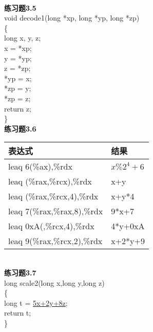 \documentclass{article}
\begin{document}
\begin{CJK}{UTF8}{uyhei}
\begin{table}[htbp]
\begin{tabular}{|m{8em}<{\centering}|m{8em}<{\centering}|m{12em}<{\centering}|}
	\hline
\end{tabular}
\end{table}	\\[2ex]
\newpage
\noindent\textbf{练习题3.5}	\\[2ex]
void decode1(long *xp, long *yp, long *zp)	\\
\{	\\
	\hspace*{4em}	long x, y, z;	\\
	\hspace*{4em}	x = *xp;	\\
	\hspace*{4em}	y = *yp;	\\
	\hspace*{4em}	z = *zp;	\\
	\hspace*{4em}	*yp = x;	\\
	\hspace*{4em}	*zp = y;	\\
	\hspace*{4em}	*zp = z;	\\
	\hspace*{4em}	return z;	\\
\}	\\[3ex]
\textbf{练习题3.6}	\\
\begin{table}[htbp]
\centering
\begin{tabular}{|m{18em}<{\centering}|m{10em}<{\centering}|}
	\hline
	表达式	&	结果	\\
	\hline
	leaq 6(\%ax),\%rdx	&	$x\%2^4+6$	\\
	\hline
	leaq (\%rax,\%rcx),\%rdx	&	x+y	\\
	\hline
	leaq (\%rax,\%rcx,4),\%rdx	&	x+y*4	\\
	\hline
	leaq 7(\%rax,\%rax,8),\%rdx	&	9*x+7	\\
	\hline
	leaq 0xA(,\%rcx,4),\%rdx	&	4*y+0xA	\\
	\hline
	leaq 9(\%rax,\%rcx,2),\%rdx	&	x+2*y+9	\\
	\hline
\end{tabular}
\end{table}	\\[2ex]
\textbf{练习题3.7}	\\[2ex]
long scale2(long x,long y,long z)	\\
\{	\\
	long t = \underline{5x+2y+8z};	\\
	return t;	\\
\}	\\[3ex]

\end{CJK}
\end{document}
